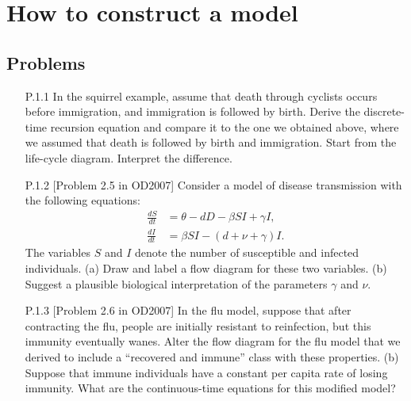 \chapter{How to construct a model}

\section{Problems}

\begin{enumerate}
	\item[P.1.1] In the squirrel example, assume that death through cyclists occurs before immigration, and immigration is followed by birth. Derive the discrete-time recursion equation and compare it to the one we obtained above, where we assumed that death is followed by birth and immigration. Start from the life-cycle diagram. Interpret the difference.
	\item[P.1.2] [Problem 2.5 in OD2007] Consider a model of disease transmission with the following equations:
		\begin{subequations}
			\label{eq:prob1-1}
			\begin{align}
				\frac{dS}{dt} & = \theta - d D - \beta S I + \gamma I,\\
				\frac{dI}{dt} & = \beta S I - (d + \nu + \gamma) I.
			\end{align}
		\end{subequations}
		The variables $S$ and $I$ denote the number of susceptible and infected individuals. (a) Draw and label a flow diagram for these two variables. (b) Suggest a plausible biological interpretation of the parameters $\gamma$ and $\nu$.
	\item[P.1.3] [Problem 2.6 in OD2007] In the flu model, suppose that after contracting the flu, people are initially resistant to reinfection, but this immunity eventually wanes. Alter the flow diagram for the flu model that we derived to include a ``recovered and immune'' class with these properties. (b) Suppose that immune individuals have a constant per capita rate of losing immunity. What are the continuous-time equations for this modified model?
\end{enumerate}